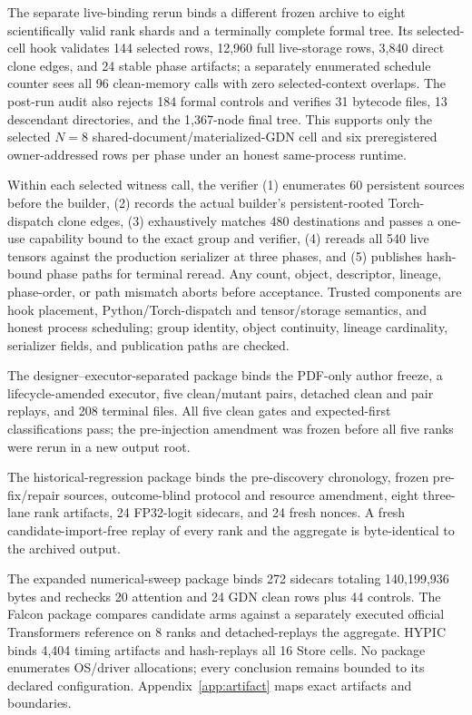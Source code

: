 \documentclass{article}
\begin{document}
The separate live-binding rerun binds a different frozen archive to eight
scientifically valid rank shards and a terminally complete formal tree.  Its
selected-cell hook validates 144 selected rows, 12,960 full live-storage rows,
3,840 direct clone edges, and 24 stable phase artifacts; a separately enumerated
schedule counter sees all 96 clean-memory calls with zero selected-context
overlaps.  The
post-run audit also rejects 184 formal controls and verifies 31 bytecode files,
13 descendant directories, and the 1,367-node final tree.  This supports only
the selected $N=8$ shared-document/materialized-GDN cell and six preregistered
owner-addressed rows per phase under an honest same-process runtime.

Within each selected witness call, the verifier (1) enumerates 60 persistent
sources before the builder, (2) records the actual builder's persistent-rooted
Torch-dispatch clone edges, (3) exhaustively matches 480 destinations and passes
a one-use capability bound to the exact group and verifier, (4) rereads all 540
live tensors against the production serializer at three phases, and (5)
publishes hash-bound phase paths for terminal reread.  Any count, object,
descriptor, lineage, phase-order, or path mismatch aborts before acceptance.
Trusted components are hook placement, Python/Torch-dispatch and tensor/storage
semantics, and honest process scheduling; group identity, object continuity,
lineage cardinality, serializer fields, and publication paths are checked.

The designer--executor-separated package binds the PDF-only author freeze, a
lifecycle-amended executor, five clean/mutant pairs, detached clean and pair
replays, and 208 terminal files.  All five clean gates and expected-first
classifications pass; the pre-injection amendment was frozen before all five
ranks were rerun in a new output root.

The historical-regression package binds the pre-discovery chronology, frozen
pre-fix/repair sources, outcome-blind protocol and resource amendment, eight
three-lane rank artifacts, 24 FP32-logit sidecars, and 24 fresh nonces.  A fresh
candidate-import-free replay of every rank and the aggregate is byte-identical
to the archived output.

The expanded numerical-sweep package binds 272 sidecars totaling 140,199,936
bytes and rechecks 20 attention and 24 GDN clean rows plus 44 controls.  The
Falcon package compares candidate arms against a separately executed official
Transformers reference on 8 ranks and detached-replays the aggregate.  HYPIC
binds 4,404 timing artifacts and hash-replays all 16 Store cells.  No package
enumerates OS/driver allocations; every conclusion remains bounded to its
declared configuration.  Appendix~\ref{app:artifact} maps exact artifacts and
boundaries.
\end{document}
